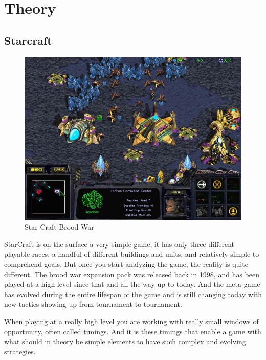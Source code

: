 
\chapter{Theory}
\section{Starcraft}

\begin{figure}[h!tb]
\centering
\includegraphics[scale=0.5]{graphics/scbw.jpg}
\caption{Star Craft Brood War}
\label{fig:scbwIntro}
\end{figure}
StarCraft is on the surface a very simple game, it has only three different playable races, a
handful of different buildings and units, and relatively simple to comprehend
goals. But once you start analyzing the game, the reality is quite different. The brood war expansion pack was released back in 1998, and has been played at a high level since that and all the way up to today. And the meta game has evolved during the entire lifespan of the game and is still changing today with new tactics showing up from tournament to tournament.
\cite{blizzardstarcraft}

When playing at a really high level you are working with really small windows of opportunity, often called timings. And it is these timings that enable a game with what should in theory be simple elements to have such complex and evolving strategies.

